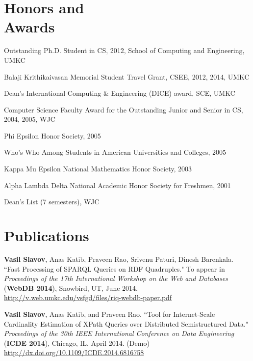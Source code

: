 \documentclass[margin,line]{resume}
\begin{document}
\begin{resume}
    \section{\mysidestyle Honors and\\Awards} 
    \begin{list3}
    \item Outstanding Ph.D. Student in CS, 2012, School of Computing and Engineering, UMKC
    \item Balaji Krithikaivasan Memorial Student Travel Grant, CSEE, 2012, 2014, UMKC
    \item Dean's International Computing \& Engineering (DICE) award, SCE, UMKC
    \item Computer Science Faculty Award for the Outstanding Junior and Senior in CS, 2004, 2005, WJC
    \item Phi Epsilon Honor Society, 2005
    \item Who's Who Among Students in American Universities and Colleges, 2005
    \item Kappa Mu Epsilon National Mathematics Honor Society, 2003
    \item Alpha Lambda Delta National Academic Honor Society for Freshmen, 2001
    \item Dean's List (7 semesters), WJC
    \end{list3}

    \section{\mysidestyle Publications}

\textbf{Vasil Slavov}, Anas Katib, Praveen Rao, Srivenu Paturi, Dinesh Barenkala.
    ``Fast Processing of SPARQL Queries on RDF Quadruples."
    To appear in \textsl{Proceedings of the 17th International Workshop on the Web and Databases} (\textbf{WebDB 2014}), Snowbird, UT, June 2014.
\url{http://v.web.umkc.edu/vsfgd/files/riq-webdb-paper.pdf}

\vspace{-2mm}
    \textbf{Vasil Slavov}, Anas Katib, and Praveen Rao.
    ``Tool for Internet-Scale Cardinality Estimation of XPath Queries over Distributed Semistructured Data."
    \textsl{Proceedings of the 30th IEEE International Conference on Data Engineering} (\textbf{ICDE 2014}), Chicago, IL, April 2014. (Demo)
\url{http://dx.doi.org/10.1109/ICDE.2014.6816758}


\end{resume}
\end{document}
